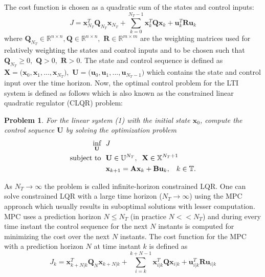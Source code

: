 \documentclass{article}
\newtheorem{problem}{Problem}
\begin{document}
The cost function is chosen as  a quadratic sum of the states  and control inputs:
\begin{equation}
J=\textbf{x}_{N_T}^{T}\textbf{Q}_{N_T}\textbf{x}_{N_T}+ \sum_{k=0}^{{N_T}-1}\textbf{x}_{k}^{T}\textbf{Q}\textbf{x}_{k}+\textbf{u}_{k}^{T}\textbf{R}\textbf{u}_{k} 
\end{equation}
where $\textbf{Q}_{N_T}\in \mathbb{R}^{n\times n},\textbf{Q} \in \mathbb{R}^{n \times n},$ $\textbf{R}  \in \mathbb{R}^{m \times m}$ are the weighting matrices used for relatively weighting the states and control inputs and to be chosen such that $\textbf{Q}_{N_T} \geq 0,$ $\textbf{Q} >0,$ $\textbf{R}>0$. The state and control sequence  is defined as $\textbf{X}=\big(\textbf{x}_{0}, \textbf{x}_{1},...,\textbf{x}_{{N_T}} \big),$
$\textbf{U}= 
\big(\textbf{u}_{0},\textbf{u}_{1},..., \textbf{u}_{{N_T}-1}
\big)$
which contains the state and control input over the time horizon.
 Now, the optimal control problem for the LTI system is defined as follows which is also known as the constrained linear quadratic regulator (CLQR) problem:
\begin{problem}
For the linear system (1) with the initial state $\textbf{x}_{0}$,
compute the control sequence $\textbf{U}$  by solving the optimization problem
\begin{equation}
    \begin{aligned}
    \underset{\textbf{U}}{\mbox{inf}} ~&~  J\\ \text{subject to}
    ~&~ \textbf{U} \in \mathbb{U}^{N_T}, \hspace{.2cm} \textbf{X}\in \mathbb{X}^{{N_T}+1}\\
    ~&~ \textbf{x}_{k+1}=\textbf{A}\textbf{x}_{k}+\textbf{B}\textbf{u}_{k}, \hspace{.3cm}k\in \mathbb{T}.
    \end{aligned}
\end{equation}
\end{problem}
As $N_T \rightarrow \infty$ the problem is called infinite-horizon constrained LQR. One can solve constrained LQR with a large time horizon ($N_T \rightarrow \infty$) using the MPC approach which usually results in suboptimal solutions with lesser computation. MPC uses a prediction horizon ${N} \leq N_T$ (in practice ${N} << N_T$) and during every time instant the control sequence for the next ${N}$ instants is computed for minimizing the cost over the next ${N}$ instants.
The cost function for the MPC with a prediction horizon $N$ at time instant $k$ is defined as
\begin{equation}
    J_k=\textbf{x}_{k+{N}|k}^{T}\textbf{Q}_{{N}}\textbf{x}_{k+{N}|k}+\sum_{i=k}^{k+{N}-1}\textbf{x}_{i|k}^{T}\textbf{Q}\textbf{x}_{i|k}+\textbf{u}_{i|k}^{T}\textbf{R}\textbf{u}_{i|k} 
\end{equation}
\end{document}
